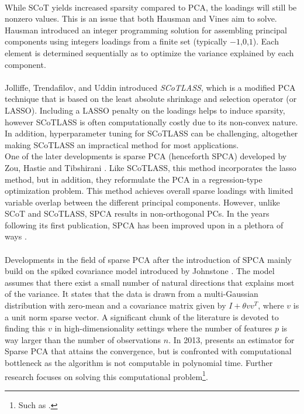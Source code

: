\documentclass[11pt,letterpaper]{report}
\begin{document}
\\
While SCoT yields increased sparsity compared to PCA, the loadings will still be nonzero values. This is an issue that both Hausman \citeyear{Hausman1982} and Vines \citeyear{Vines2000} aim to solve. Hausman introduced an integer programming solution for assembling principal components using integers loadings from a finite set (typically {$-1$,$0$,$1$}). Each element is determined sequentially as to optimize the variance explained by each component.\\ 
\\
Jolliffe, Trendafilov, and Uddin \citeyear{Jolliffe2003} introduced \textit{SCoTLASS}, which is a modified PCA technique that is based on the least absolute shrinkage and selection operator (or LASSO). Including a LASSO penalty on the loadings helps to induce sparsity, however SCoTLASS is often computationally costly due to its non-convex nature. In addition, hyperparameter tuning for SCoTLASS can be challenging, altogether making SCoTLASS an impractical method for most applications.\\

One of the later developments is sparse PCA (henceforth SPCA) developed by Zou, Hastie and Tibshirani \citeyear{Zou2006}. Like SCoTLASS, this method incorporates the lasso method, but in addition, they reformulate the PCA in a regression-type optimization problem. This method achieves overall sparse loadings with limited variable overlap between the different principal components. However, unlike SCoT and SCoTLASS, SPCA results in non-orthogonal PCs. In the years following its first publication, SPCA has been improved upon in a plethora of ways \cite{Shen2008, Journee2010}.\\
\\
Developments in the field of sparse PCA after the introduction of SPCA mainly build on the spiked covariance model introduced by Johnstone \citeyear{Johnstone2001}. The model assumes that there exist a small number of natural directions that explains most of the variance. It states that the data is drawn from a multi-Gaussian distribution with zero-mean and a covariance matrix given by $I+\theta vv^T$, where $v$ is a unit norm sparse vector. A significant chunk of the literature is devoted to finding this $v$ in high-dimensionality settings where the number of features $p$ is way larger than the number of observations $n$. In 2013, \citeauthor{Ma2013} presents an estimator for Sparse PCA that attains the convergence, but is confronted with computational bottleneck as the algorithm is not computable in polynomial time. Further research focuses on solving this computational problem\footnote{Such as .}.
\end{document}

